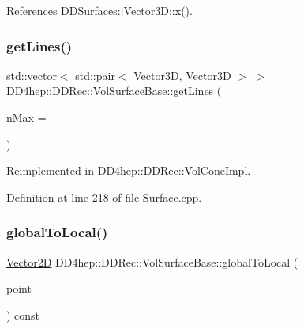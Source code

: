 References D\+D\+Surfaces\+::\+Vector3\+D\+::x().

\hypertarget{class_d_d4hep_1_1_d_d_rec_1_1_vol_surface_base_ad0863cf8ceb6a443a048fe89cdc79f26}{}\label{class_d_d4hep_1_1_d_d_rec_1_1_vol_surface_base_ad0863cf8ceb6a443a048fe89cdc79f26} 
\subsubsection{\texorpdfstring{get\+Lines()}{getLines()}}
{\footnotesize\ttfamily std\+::vector$<$ std\+::pair$<$ \hyperlink{class_d_d_surfaces_1_1_vector3_d}{Vector3D}, \hyperlink{class_d_d_surfaces_1_1_vector3_d}{Vector3D} $>$ $>$ D\+D4hep\+::\+D\+D\+Rec\+::\+Vol\+Surface\+Base\+::get\+Lines (\begin{DoxyParamCaption}\item[{unsigned}]{n\+Max = {} }\end{DoxyParamCaption})\hspace{0.3cm}{\ttfamily [virtual]}}



Reimplemented in \hyperlink{class_d_d4hep_1_1_d_d_rec_1_1_vol_cone_impl_ae644bf91eb0b033f16ac4d89d00dd080}{D\+D4hep\+::\+D\+D\+Rec\+::\+Vol\+Cone\+Impl}.



Definition at line 218 of file Surface.\+cpp.

\hypertarget{class_d_d4hep_1_1_d_d_rec_1_1_vol_surface_base_a9f2549dc5b7d2fbf58d1ef8c6699b49f}{}\label{class_d_d4hep_1_1_d_d_rec_1_1_vol_surface_base_a9f2549dc5b7d2fbf58d1ef8c6699b49f} 
\subsubsection{\texorpdfstring{global\+To\+Local()}{globalToLocal()}}
{\footnotesize\ttfamily \hyperlink{class_d_d_surfaces_1_1_vector2_d}{Vector2D} D\+D4hep\+::\+D\+D\+Rec\+::\+Vol\+Surface\+Base\+::global\+To\+Local (\begin{DoxyParamCaption}\item[{const \hyperlink{class_d_d_surfaces_1_1_vector3_d}{Vector3D} \&}]{point }\end{DoxyParamCaption}) const\hspace{0.3cm}{\ttfamily [virtual]}}

